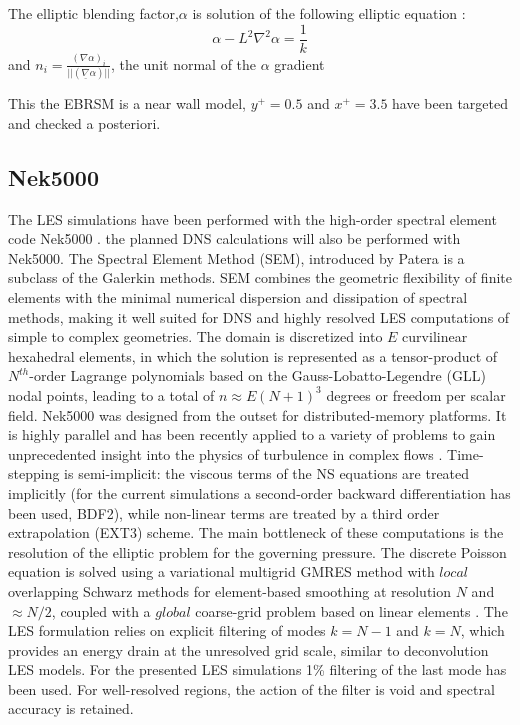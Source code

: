 \documentclass[11pt,letterpaper,english]{article}
\begin{document}
The elliptic blending factor,$\alpha$ is solution of the following elliptic equation :
\begin{equation}
  \alpha - L^{2} \nabla^{2} \alpha = \frac{1}{k} 
\end{equation}
and $n_{i} = \frac{(\nabla \alpha)_{i}}{||(\underline{\nabla} \alpha)||}$, the unit normal of the $\alpha$ gradient

This the EBRSM is a near wall model, $y^{+} = 0.5$ and $x^{+} = 3.5$ have been targeted and checked a posteriori.



\subsection{Nek5000}
The LES simulations have been performed with the high-order spectral element code Nek5000 \cite{fischer2002}. the planned DNS calculations will also be performed with Nek5000. The Spectral Element Method (SEM), introduced by Patera \cite{patera1984} is a subclass of the Galerkin methods. SEM combines the geometric flexibility of finite elements with the minimal numerical dispersion and dissipation of spectral methods, making it well suited for DNS and highly resolved LES computations of simple to complex geometries. The domain is discretized into $E$ curvilinear hexahedral elements, in which the solution is represented as a tensor-product of $N^{th}$-order Lagrange polynomials based on the Gauss-Lobatto-Legendre (GLL) nodal points, leading to a total of $n\approx E (N+1)^3$ degrees or freedom per scalar field. Nek5000 was designed from the outset for distributed-memory platforms. It is highly parallel and has been recently applied to a variety of problems to gain unprecedented insight into the physics of turbulence in complex flows \cite{obabko2015}. Time-stepping is semi-implicit: the viscous terms of the NS equations are treated implicitly (for the current simulations a second-order backward differentiation has been used,  BDF2), while non-linear terms are treated by a third order extrapolation (EXT3) scheme. The main bottleneck of these computations is the resolution of the elliptic problem for the governing pressure. The discrete Poisson equation is solved using a variational multigrid GMRES method with $local$ overlapping Schwarz methods for element-based smoothing at resolution $N$ and $\approx N/2$, coupled with a $global$ coarse-grid problem based on linear elements \cite{fischer2005}. The LES formulation relies on explicit filtering \cite{slotz2005} of modes $k=N-1$ and $k=N$, which provides an energy drain at the unresolved grid scale, similar to deconvolution LES models. For the presented LES simulations 1\% filtering of the last mode has been used. For well-resolved regions, the action of the filter is void and spectral accuracy is retained.
\end{document}
